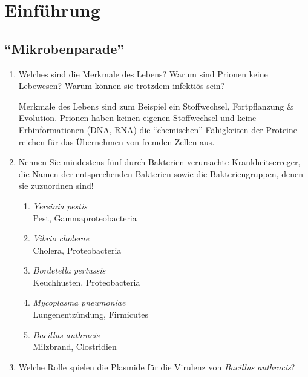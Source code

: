 \section{Einführung}
\subsection*{``Mikrobenparade''}
\begin{enumerate}
	\item Welches sind die Merkmale des Lebens? Warum sind Prionen keine Lebewesen? Warum können sie trotzdem infektiös sein? \hfill \vspace{4mm}

	Merkmale des Lebens sind zum Beispiel ein Stoffwechsel, Fortpflanzung \& Evolution.
	Prionen haben keinen eigenen Stoffwechsel und keine Erbinformationen (DNA, RNA)
	die ``chemischen'' Fähigkeiten der Proteine reichen für das Übernehmen von fremden Zellen aus.
	



	\item Nennen Sie mindestens fünf durch Bakterien verursachte Krankheitserreger, die Namen der entsprechenden Bakterien sowie die Bakteriengruppen, denen sie zuzuordnen sind!
		\label{item:boesebakterien}
	\begin{enumerate}[label=\arabic*)]
		\item \emph{Yersinia pestis} \hfill \\
			Pest, Gammaproteobacteria
		\item \emph{Vibrio cholerae} \hfill \\
			Cholera, Proteobacteria
		\item \emph{Bordetella pertussis} \hfill \\
			Keuchhusten, Proteobacteria
		\item \emph{Mycoplasma pneumoniae} \hfill \\
			Lungenentzündung, Firmicutes
		\item \emph{Bacillus anthracis} \hfill \\
			Milzbrand, Clostridien
	\end{enumerate}


	\item Welche Rolle spielen die Plasmide für die Virulenz von \emph{Bacillus anthracis}?  \hfill \vspace{0.2mm} \\


\end{enumerate}

